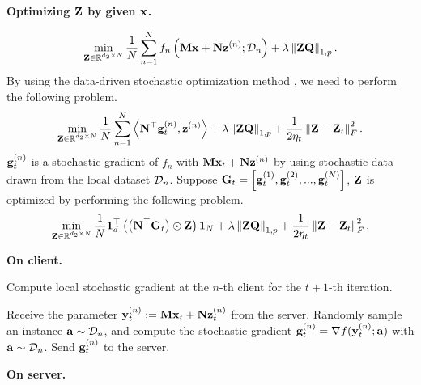 \documentclass[journal]{IEEEtran}
\newcommand\algotext[1]{\end{algorithmic}#1\begin{algorithmic}[1]}
\begin{document}
\textbf{Optimizing ${\bf Z}$ by given ${\bf x}$.}

\begin{align}
\min_{\substack{{\bf Z}\in\mathbb{R}^{d_2\times N}}} \frac{1}{N}\sum_{n=1}^N f_n\left( {\bf M}{\bf x} + {\bf N} {\bf z}^{(n)}; \mathcal{D}_n \right) + \lambda \left\lVert{\bf Z}{\bf Q}\right\rVert_{1,p}.
\end{align}  By using the data-driven stochastic optimization method \cite{dd}, we need to perform the following problem.
\begin{align}
\nonumber
\min_{\substack{{\bf Z}\in\mathbb{R}^{d_2\times N}}} \frac{1}{N}\sum_{n=1}^N \left\langle{\bf N}^\top {\bf g}_t^{(n)}, {\bf z}^{(n)} \right\rangle + \lambda \left\lVert{\bf Z}{\bf Q}\right\rVert_{1,p} + \frac{1}{2\eta_t}\left\lVert{\bf Z} - {\bf Z}_t\right\rVert_F^2.
\end{align} ${\bf g}_t^{(n)}$ is a stochastic gradient of $f_n$ with ${\bf M}{\bf x}_t + {\bf N} {\bf z}^{(n)}$ by using stochastic data  drawn from the local dataset $\mathcal{D}_n$. Suppose ${\bf G}_t = \left [ {\bf g}_t^{(1)}, {\bf g}_t^{(2)}, ..., {\bf g}_t^{(N)} \right ]$, ${\bf Z}$ is optimized by performing the following problem.
\begin{align}
\nonumber
\min_{\substack{{\bf Z}\in\mathbb{R}^{d_2\times N}}} \frac{1}{N}{\bf 1}_d^\top\left( \left( {\bf N}^\top{\bf G}_t \right) \odot {\bf Z} \right){\bf 1}_N + \lambda \left\lVert{\bf Z}{\bf Q}\right\rVert_{1,p} + \frac{1}{2\eta_t}\left\lVert{\bf Z} - {\bf Z}_t\right\rVert_F^2.
\end{align}

\textbf{On client.}  

\begin{algorithm}[!]
    \caption{Compute local stochastic gradient at the $n$-th client for the $t+1$-th iteration.}
    \label{algo_xxx}
    \begin{algorithmic}[1]
        \State Receive the parameter ${\bf y}_t^{(n)} := {\bf M}{\bf x}_t + {\bf N}{\bf z}_t^{(n)}$ from the server.
        \State Randomly sample an instance ${\bf a}\sim\mathcal{D}_n$, and compute the stochastic gradient ${\bf g}^{(n)}_t = \nabla f({\bf y}_t^{(n)};{\bf a})$ with ${\bf a}\sim\mathcal{D}_n$.
        \State Send ${\bf g}^{(n)}_t$ to the server.
    \end{algorithmic}
\end{algorithm} 





\textbf{On server.}
\end{document}
